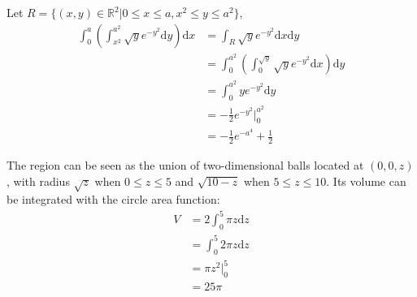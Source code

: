 \documentclass{homework}
\begin{document}
\begin{problem}{6}
Let $R = \{(x, y) \in \mathbb{R}^2 | 0 \leq x \leq a, x^2 \leq y \leq a^2\}$,
\begin{align*}
\int_0^a (\int_{x^2}^{a^2} \sqrt{y}e^{-y^2} \mathrm{d}y) \mathrm{d}x
&= \int_R \sqrt{y}e^{-y^2} \mathrm{d}x \mathrm{d}y \\
&= \int_0^{a^2} (\int_{0}^{\sqrt{y}} \sqrt{y}e^{-y^2} \mathrm{d}x) \mathrm{d}y \\
&= \int_0^{a^2} ye^{-y^2} \mathrm{d}y \\
&= -\frac{1}{2}e^{-y^2} |_0^{a^2} \\
&= -\frac{1}{2}e^{-a^4} + \frac{1}{2}
\end{align*}
\end{problem}

\begin{problem}{7}
The region can be seen as the union of two-dimensional balls located at
$(0,0,z)$, with radius $\sqrt{z}$ when $0 \leq z \leq 5$ and $\sqrt{10-z}$
when $5 \leq z \leq 10$. Its volume can be integrated with the circle area
function:
\begin{align*}
V &= 2\int_0^5 \pi z \mathrm{d}z \\
  &= \int_0^5 2\pi z \mathrm{d}z \\
  &= \pi z^2 |^5_0 \\
  &= 25\pi
\end{align*}
\end{problem}
\end{document}

